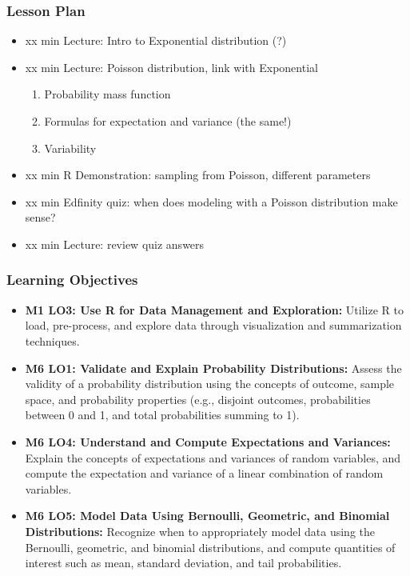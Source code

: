 \begin{frame}
    \frametitle{Lesson Plan}
    \begin{itemize}
        \item xx min Lecture: Intro to Exponential distribution (?)
        \item xx min Lecture: Poisson distribution, link with Exponential
        \begin{enumerate}
            \item Probability mass function
            \item Formulas for expectation and variance (the same!)
            \item Variability
        \end{enumerate}
        \item xx min R Demonstration: sampling from Poisson, different parameters
        \item xx min Edfinity quiz: when does modeling with a Poisson distribution make sense?
        \item xx min Lecture: review quiz answers
    \end{itemize}
\end{frame}
    
\begin{frame}
    \frametitle{Learning Objectives}
    \begin{itemize}
        \item \textbf{M1 LO3: Use R for Data Management and Exploration:} Utilize R to load, pre-process, and explore data through visualization and summarization techniques.
        \item \textbf{M6 LO1: Validate and Explain Probability Distributions:} Assess the validity of a probability distribution using the concepts of outcome, sample space, and probability properties (e.g., disjoint outcomes, probabilities between 0 and 1, and total probabilities summing to 1).
        \item \textbf{M6 LO4: Understand and Compute Expectations and Variances:} Explain the concepts of expectations and variances of random variables, and compute the expectation and variance of a linear combination of random variables.
        \item \textbf{M6 LO5: Model Data Using Bernoulli, Geometric, and Binomial Distributions:} Recognize when to appropriately model data using the Bernoulli, geometric, and binomial distributions, and compute quantities of interest such as mean, standard deviation, and tail probabilities.
    \end{itemize}
\end{frame}


